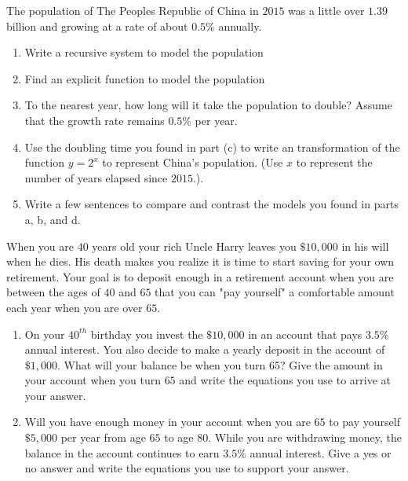 \documentclass[10pt,]{book}
\theoremstyle{ptxdefinitionnotitle}
\theoremstyle{ptxdefinitiontitle}
\theoremstyle{ptxdefinitionnotitle}
\theoremstyle{ptxdefinitiontitle}
\theoremstyle{ptxdefinitionnotitle}
\theoremstyle{ptxdefinitiontitle}
\numberwithin{equation}{section}
\begin{document}
\begin{divisionexercise}{9}\hypertarget{exercise-28}{}
\hypertarget{p-133}{}%
The population of The Peoples Republic of China in \(2015\) was a little over \(1.39\) billion and growing at a rate of about \(0.5\%\) annually. \leavevmode%
\begin{enumerate}[label=(\alph*)]
\item\hypertarget{li-58}{}Write a recursive system to model the population%
\item\hypertarget{li-59}{}Find an explicit function to model the population%
\item\hypertarget{li-60}{}To the nearest year, how long will it take the population to double? Assume that the growth rate remains \(0.5\%\) per year.%
\item\hypertarget{li-61}{}Use the doubling time you found in part (c) to write an transformation of the function \(y=2^x\) to represent China's population. (Use \(x\) to represent the number of years elapsed since \(2015\).).%
\item\hypertarget{li-62}{}Write a few sentences to compare and contrast the models you found in parts a, b, and d.%
\end{enumerate}
%
\end{divisionexercise}%
\begin{divisionexercise}{10}\hypertarget{exercise-29}{}
\hypertarget{p-134}{}%
When you are \(40\) years old your rich Uncle Harry leaves you \(\$10,000\) in his will when he dies.  His death makes you realize it is time to start saving for your own retirement. Your goal is to deposit enough in a retirement account when you are between the ages of \(40\) and \(65\) that you can "pay yourself" a comfortable amount each year when you are over \(65\). \leavevmode%
\begin{enumerate}[label=(\alph*)]
\item\hypertarget{li-63}{}On your \(40^{th}\) birthday you invest the \(\$10,000\) in an account that pays \(3.5\%\) annual interest.  You also decide to make a yearly deposit in the account of \(\$1,000\). What will your balance be when you turn \(65\)?  Give the amount in your account when you turn \(65\) and write the equations you use to arrive at your answer.%
\item\hypertarget{li-64}{}Will you have enough money in your account when you are \(65\) to pay yourself \(\$5,000\) per year from age \(65\) to age \(80\).  While you are withdrawing money, the balance in the account continues to earn \(3.5\%\) annual interest.  Give a yes or no answer and write the equations you use to support your answer.%
\end{enumerate}
%
\end{divisionexercise}%
\end{document}
